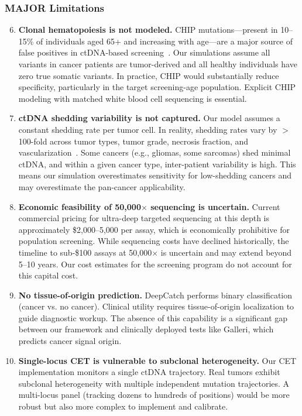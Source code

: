 \documentclass[10pt,a4paper]{article}
\begin{document}
\subsubsection{MAJOR Limitations}

\begin{enumerate}
\setcounter{enumi}{5}
\item \textbf{Clonal hematopoiesis is not modeled.} CHIP mutations—present in 10--15\% of individuals aged 65+ and increasing with age—are a major source of false positives in ctDNA-based screening~\cite{razavi2019high}. Our simulations assume all variants in cancer patients are tumor-derived and all healthy individuals have zero true somatic variants. In practice, CHIP would substantially reduce specificity, particularly in the target screening-age population. Explicit CHIP modeling with matched white blood cell sequencing is essential.

\item \textbf{ctDNA shedding variability is not captured.} Our model assumes a constant shedding rate per tumor cell. In reality, shedding rates vary by $>$100-fold across tumor types, tumor grade, necrosis fraction, and vascularization~\cite{avanzini2020mathematical}. Some cancers (e.g., gliomas, some sarcomas) shed minimal ctDNA, and within a given cancer type, inter-patient variability is high. This means our simulation overestimates sensitivity for low-shedding cancers and may overestimate the pan-cancer applicability.

\item \textbf{Economic feasibility of 50,000$\times$ sequencing is uncertain.} Current commercial pricing for ultra-deep targeted sequencing at this depth is approximately \$2,000--5,000 per assay, which is economically prohibitive for population screening. While sequencing costs have declined historically, the timeline to sub-\$100 assays at 50,000$\times$ is uncertain and may extend beyond 5--10 years. Our cost estimates for the screening program do not account for this capital cost.

\item \textbf{No tissue-of-origin prediction.} DeepCatch performs binary classification (cancer vs. no cancer). Clinical utility requires tissue-of-origin localization to guide diagnostic workup. The absence of this capability is a significant gap between our framework and clinically deployed tests like Galleri, which predicts cancer signal origin.

\item \textbf{Single-locus CET is vulnerable to subclonal heterogeneity.} Our CET implementation monitors a single ctDNA trajectory. Real tumors exhibit subclonal heterogeneity with multiple independent mutation trajectories. A multi-locus panel (tracking dozens to hundreds of positions) would be more robust but also more complex to implement and calibrate.


\end{enumerate}
\end{document}
